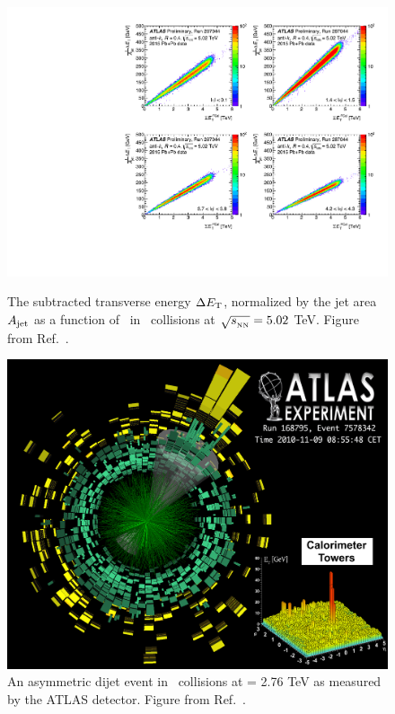 \begin{figure}
\centering
  \begin{minipage}{0.45\textwidth}
	\includegraphics[width=1.\textwidth]{figures/setup/subtr_energy} %
	\caption{The subtracted transverse energy $\Delta \mbox{$E_{\mathrm{T}}$}$, normalized by the jet area $A_{\rm{jet}}$ as a function of \ETfcal\ in \pbpb\ collisions at $\mbox{$\sqrt{s_{_\text{NN}}}$} = 5.02$ TeV.
	Figure from Ref.~\cite{perfPlots}.}	
	\label{fig:subtr_energy}
  \end{minipage}
 \qquad 
  \begin{minipage}{0.43\textwidth}
	\includegraphics[width=1.\textwidth]{figures/setup/jet_event_display} %
	\caption{
	An asymmetric dijet event in \pbpb\ collisions at \sqrtsnn = 2.76 TeV as measured by the ATLAS detector. 
	Figure from Ref.~\cite{atlasRun1EventDisplay}.}	
	\label{fig:jet_event_display}
  \end{minipage}
\end{figure}



